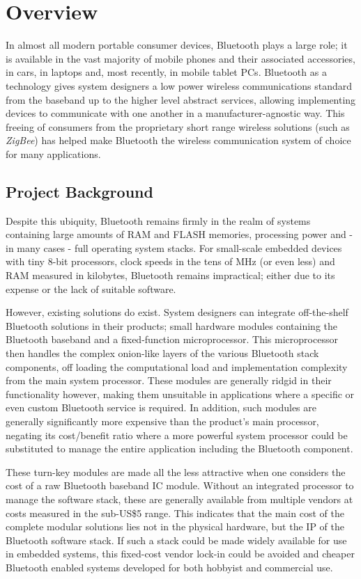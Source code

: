 \chapter{Overview}
\label{chp:overview}

In almost all modern portable consumer devices, Bluetooth plays a large role; it is available in the vast majority of mobile phones and their associated accessories, in cars, in laptops and, most recently, in mobile tablet PCs. Bluetooth as a technology gives system designers a low power wireless communications standard from the baseband up to the higher level abstract services, allowing implementing devices to communicate with one another in a manufacturer-agnostic way. This freeing of consumers from the proprietary short range wireless solutions (such as \textit{ZigBee}) has helped make Bluetooth the wireless communication system of choice for many applications.

\section{Project Background}

Despite this ubiquity, Bluetooth remains firmly in the realm of systems containing large amounts of RAM and FLASH memories, processing power and - in many cases - full operating system stacks. For small-scale embedded devices with tiny 8-bit processors, clock speeds in the tens of MHz (or even less) and RAM measured in kilobytes, Bluetooth remains impractical; either due to its expense or the lack of suitable software.

However, existing solutions do exist. System designers can integrate off-the-shelf Bluetooth solutions in their products; small hardware modules containing the Bluetooth baseband and a fixed-function microprocessor. This microprocessor then handles the complex onion-like layers of the various Bluetooth stack components, off loading the computational load and implementation complexity from the main system processor. These modules are generally ridgid in their functionality however, making them unsuitable in applications where a specific or even custom Bluetooth service is required. In addition, such modules are generally significantly more expensive than the product's main processor, negating its cost/benefit ratio where a more powerful system processor could be substituted to manage the entire application including the Bluetooth component.

These turn-key modules are made all the less attractive when one considers the cost of a raw Bluetooth baseband IC module. Without an integrated processor to manage the software stack, these are generally available from multiple vendors at costs measured in the sub-US\$5 range. This indicates that the main cost of the complete modular solutions lies not in the physical hardware, but the IP of the Bluetooth software stack. If such a stack could be made widely available for use in embedded systems, this fixed-cost vendor lock-in could be avoided and cheaper Bluetooth enabled systems developed for both hobbyist and commercial use.

